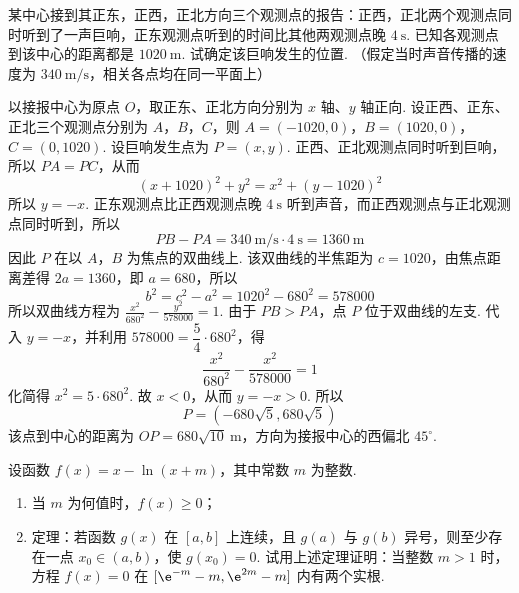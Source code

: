 \begin{problem}
某中心接到其正东，正西，正北方向三个观测点的报告：正西，正北两个观测点同时听到了一声巨响，正东观测点听到的时间比其他两观测点晚 \(4\mathrm{~s}\). 已知各观测点到该中心的距离都是 \(1020\mathrm{~m}\). 试确定该巨响发生的位置. （假定当时声音传播的速度为 \(340\mathrm{~m/s}\)，相关各点均在同一平面上）
\end{problem}

\begin{solution}
以接报中心为原点 \(O\)，取正东、正北方向分别为 \(x\) 轴、\(y\) 轴正向. 设正西、正东、正北三个观测点分别为 \(A\)，\(B\)，\(C\)，则
\(A=(-1020,0)\)，\(B=(1020,0)\)，\(C=(0,1020)\).
设巨响发生点为 \(P=(x,y)\). 正西、正北观测点同时听到巨响，所以 \(PA=PC\)，从而
\[
(x+1020)^2+y^2=x^2+(y-1020)^2
\]
所以 \(y=-x\).
正东观测点比正西观测点晚 \(4\mathrm{~s}\) 听到声音，而正西观测点与正北观测点同时听到，所以
\[
PB-PA=340\mathrm{~m/s}\cdot4\mathrm{~s}=1360\mathrm{~m}
\]
因此 \(P\) 在以 \(A\)，\(B\) 为焦点的双曲线上. 该双曲线的半焦距为 \(c=1020\)，由焦点距离差得 \(2a=1360\)，即 \(a=680\)，所以
\[
b^2=c^2-a^2=1020^2-680^2=578000
\]
所以双曲线方程为 \(\frac{x^2}{680^2}-\frac{y^2}{578000}=1\). 由于 \(PB>PA\)，点 \(P\) 位于双曲线的左支.
代入 \(y=-x\)，并利用 \(578000=\dfrac54\cdot680^2\)，得
\[
\frac{x^2}{680^2}-\frac{x^2}{578000}=1
\]
化简得 \(x^2=5\cdot680^2\).
故 \(x<0\)，从而 \(y=-x>0\). 所以
\[
P=(-680\sqrt5,680\sqrt5)
\]
该点到中心的距离为 \(OP=680\sqrt{10}\mathrm{~m}\)，方向为接报中心的西偏北 \(45^{\circ}\).
\end{solution}

\begin{problem}
设函数 \( f(x) = x - \ln (x + m) \)，其中常数 \(m\) 为整数.

\begin{enumerate}
\item 当 \(m\) 为何值时，\(f(x) \geqslant 0\)；
\item 定理：若函数 \(g(x)\) 在 \([a, b]\) 上连续，且 \(g(a)\) 与 \(g(b)\) 异号，则至少存在一点 \(x_0 \in (a, b)\)，使 \(g(x_0) = 0\). 试用上述定理证明：当整数 \(m > 1\) 时，方程 \(f(x) = 0\) 在 \([\e^{-m} - m, \e^{2m} - m]\) 内有两个实根.
\end{enumerate}
\end{problem}

